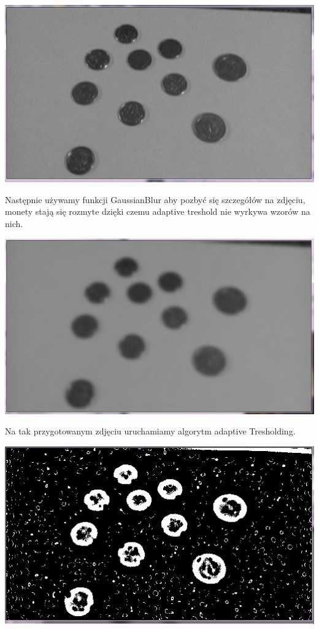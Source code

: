 \documentclass[12pt]{article}
\begin{document}
\includegraphics[scale=0.4]{AdaptiveTGray}

Następnie używamy funkcji GaussianBlur aby pozbyć się szczegółów na zdjęciu, monety stają się rozmyte dzięki czemu adaptive treshold nie wyrkywa wzorów na nich.

\includegraphics[scale=0.4]{AdaptiveTBlur}

Na tak przygotowanym zdjęciu uruchamiamy algorytm adaptive Tresholding.

\includegraphics[scale=0.4]{AdaptiveT}
\end{document}
